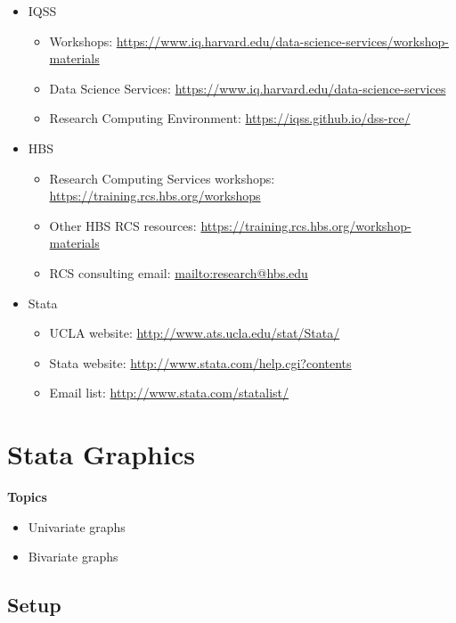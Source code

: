 \documentclass[
]{book}
\providecommand{\tightlist}{%
  \setlength{\itemsep}{0pt}\setlength{\parskip}{0pt}}
\begin{document}
\begin{itemize}
\tightlist
\item
  IQSS

  \begin{itemize}
  \tightlist
  \item
    Workshops: \url{https://www.iq.harvard.edu/data-science-services/workshop-materials}
  \item
    Data Science Services: \url{https://www.iq.harvard.edu/data-science-services}
  \item
    Research Computing Environment: \url{https://iqss.github.io/dss-rce/}
  \end{itemize}
\item
  HBS

  \begin{itemize}
  \tightlist
  \item
    Research Computing Services workshops: \url{https://training.rcs.hbs.org/workshops}
  \item
    Other HBS RCS resources: \url{https://training.rcs.hbs.org/workshop-materials}
  \item
    RCS consulting email: \url{mailto:research@hbs.edu}
  \end{itemize}
\item
  Stata

  \begin{itemize}
  \tightlist
  \item
    UCLA website: \url{http://www.ats.ucla.edu/stat/Stata/}
  \item
    Stata website: \url{http://www.stata.com/help.cgi?contents}
  \item
    Email list: \url{http://www.stata.com/statalist/}
  \end{itemize}
\end{itemize}

\hypertarget{stata-graphics}{%
\chapter{Stata Graphics}\label{stata-graphics}}

\textbf{Topics}

\begin{itemize}
\tightlist
\item
  Univariate graphs
\item
  Bivariate graphs
\end{itemize}

\hypertarget{setup-9}{%
\section{Setup}\label{setup-9}}
\end{document}
